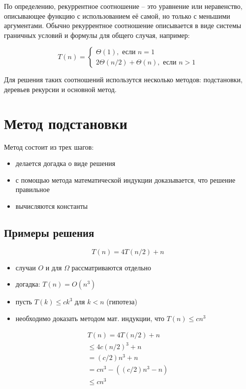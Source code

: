 \documentclass[11pt]{article}
\begin{document}
По определению, рекуррентное соотношение -- это уравнение или неравенство,
описывающее функцию с использованием её самой, но только с меньшими аргументами.
Обычно рекуррентное соотношение описывается в виде системы граничных условий
и формулы для общего случая, например:

\begin{equation*}
  T(n) = \begin{cases}
    \Theta(1), \text{ если } n = 1 \\
    2\Theta(n/2) + \Theta(n), \text{ если } n > 1
    \end{cases}
\end{equation*}

Для решения таких соотношений использутся несколько методов: подстановки, деревьев
рекурсии и основной метод.

\section{Метод подстановки}

Метод состоит из трех шагов:
\begin{itemize}
\item делается догадка о виде решения
\item с помощью метода математической индукции доказывается, что решение правильное
\item вычисляются константы 
\end{itemize}

\subsection{Примеры решения}
\begin{equation*}
	T(n) = 4T(n/2) + n
\end{equation*}
\begin{itemize}
\item случаи $O$ и для $\Omega$ рассматриваются отдельно
\item догадка: $T(n) = O(n^3)$
\item пусть $T(k) \leqslant c k^3$ для $k < n$ (гипотеза)
\item необходимо доказать методом мат. индукции, что $T(n) \leqslant c n^3$
\end{itemize}
\begin{align*}
  T(n) = 4T(n/2) + n \\
    \leqslant 4c(n/2)^3 + n \\
    = (c/2)n^3 + n \\
    = c n^3 - ((c/2)n^3 -n) \\
    \leqslant c n^3
\end{align*}
\end{document}
